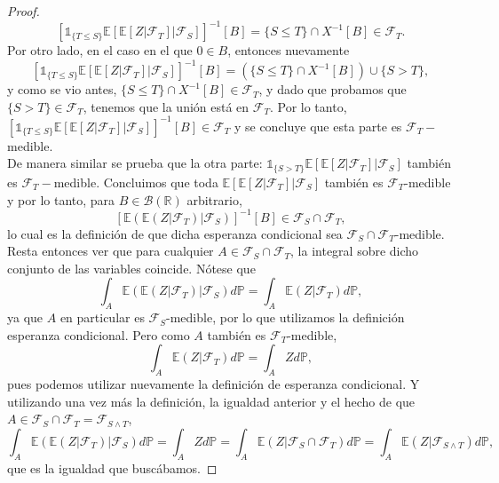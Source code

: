 \documentclass[letterpaper]{article}
\newcommand{\R}{\mathbb{R}}
\newcommand{\F}{\mathcal{F}}
\newcommand{\B}{\mathcal{B}}
\newcommand{\E}{\mathbb{E}}
\renewcommand{\P}{\mathbb{P}}
\newcommand{\1}{\mathds{1}}
\theoremstyle{definition}
\theoremstyle{definition}
\theoremstyle{definition}
\theoremstyle{definition}
\theoremstyle{definition}
\begin{document}
\begin{enumerate}
\begin{proof}
        \[
            \left[\1_{\{T\leq S\}}\E\left[\E\left[Z|\F_T\right]|\F_S\right]\right]^{-1}[B]=\{S\leq T\}\cap X^{-1}[B]\in \F_T.
        \]
        Por otro lado, en el caso en el que $0\in B$, entonces nuevamente
        \[
            \left[\1_{\{T\leq S\}}\E\left[\E\left[Z|\F_T\right]|\F_S\right]\right]^{-1}[B]=(\{S\leq T\}\cap X^{-1}[B])\cup \{S>T\},    
        \]
        y como se vio antes, $\{S\leq T\}\cap X^{-1}[B]\in \F_T$, y dado que probamos que $\{S>T\}\in \F_T$, tenemos que la unión está en $\F_T$.
        Por lo tanto, $\left[\1_{\{T\leq S\}}\E\left[\E\left[Z|\F_T\right]|\F_S\right]\right]^{-1}[B]\in \F_T$ y se concluye que esta parte
        es $\F_T-$medible.\\
        
       De manera similar se prueba que la otra parte: $\1_{\{S>T\}}\E\left[\E\left[Z|\F_T\right]|\F_S\right]$ también es $\F_T-$medible.
        Concluimos que toda $\E\left[\E\left[Z|\F_T\right]|\F_S\right]$ también es $\F_T$-medible y
        por lo tanto, para $B\in \B(\R)$ arbitrario,
            \[
                \left[\E\left(\E \left(Z|\F_T\right)|\F_S\right)\right]^{-1}[B]\in \F_S\cap\F_T,
            \]
            lo cual es la definición de que dicha esperanza condicional sea $\F_S\cap\F_T$-medible. Resta entonces
            ver que para cualquier $A\in \F_S\cap\F_T$, la integral sobre dicho conjunto de las variables coincide. 
            Nótese que
            \[
            \int_{A}\E\left(\E \left(Z|\F_T\right)|\F_S\right)d\P=\int_{A}\E \left(Z|\F_T\right)d\P,
            \]
            ya que $A$ en particular es $\F_S$-medible, por lo que utilizamos la definición esperanza
            condicional. Pero como $A$ también es $\F_T$-medible, 
            \[
                \int_{A}\E \left(Z|\F_T\right)d\P=\int_{A}Zd\P,
            \]
            pues podemos utilizar nuevamente la definición de esperanza condicional. Y utilizando
            una vez más la definición, la igualdad anterior y el hecho de que $A\in \F_S\cap\F_T=\F_{S\wedge T}$,
            \[
                \int_{A}\E\left(\E \left(Z|\F_T\right)|\F_S\right)d\P=\int_AZd\P=\int_A\E(Z|\F_S\cap\F_T)d\P=\int_A\E(Z|\F_{S\wedge T})d\P,    
            \]
            que es la igualdad que buscábamos.
    \end{proof}
    

\end{enumerate}
\end{document}
